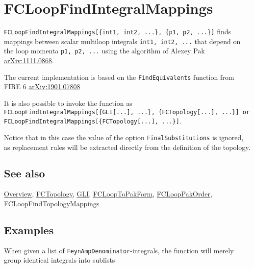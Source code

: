 \documentclass[../FeynCalcManual.tex]{subfiles}
\begin{document}
\hypertarget{fcloopfindintegralmappings}{
\section{FCLoopFindIntegralMappings}\label{fcloopfindintegralmappings}}

\texttt{FCLoopFindIntegralMappings[\allowbreak{}\{\allowbreak{}int1,\ \allowbreak{}int2,\ \allowbreak{}...\},\ \allowbreak{}\{\allowbreak{}p1,\ \allowbreak{}p2,\ \allowbreak{}...\}]}
finds mappings between scalar multiloop integrals
\texttt{int1,\ \allowbreak{}int2,\ \allowbreak{}...} that depend on the
loop momenta \texttt{p1,\ \allowbreak{}p2,\ \allowbreak{}...} using the
algorithm of Alexey Pak
\href{https://arxiv.org/abs/1111.0868}{arXiv:1111.0868}.

The current implementation is based on the \texttt{FindEquivalents}
function from FIRE 6
\href{https://arxiv.org/abs/1901.07808}{arXiv:1901.07808}

It is also possible to invoke the function as
\texttt{FCLoopFindIntegralMappings[\allowbreak{}\{\allowbreak{}GLI[\allowbreak{}...],\ \allowbreak{}...\},\ \allowbreak{}\{\allowbreak{}FCTopology[\allowbreak{}...],\ \allowbreak{}...\}] or FCLoopFindIntegralMappings[\allowbreak{}\{\allowbreak{}FCTopology[\allowbreak{}...],\ \allowbreak{}...\}]}.

Notice that in this case the value of the option
\texttt{FinalSubstitutions} is ignored, as replacement rules will be
extracted directly from the definition of the topology.

\subsection{See also}

\hyperlink{toc}{Overview}, \hyperlink{fctopology}{FCTopology},
\hyperlink{gli}{GLI}, \hyperlink{fclooptopakform}{FCLoopToPakForm},
\hyperlink{fclooppakorder}{FCLoopPakOrder},
\hyperlink{fcloopfindtopologymappings}{FCLoopFindTopologyMappings}

\subsection{Examples}

When given a list of \texttt{FeynAmpDenominator}-integrals, the function
will merely group identical integrals into sublists

\begin{Shaded}
\begin{Highlighting}[]
\ExtensionTok{=} \OperatorTok{\{}\OperatorTok{[\{}\OperatorTok{,}\OperatorTok{\}],}\OperatorTok{[\{}\SpecialCharTok{+} \OperatorTok{,}\OperatorTok{\}],}\OperatorTok{[\{}\OperatorTok{,}\OperatorTok{\}]\}}
\end{Highlighting}
\end{Shaded}
\end{document}
